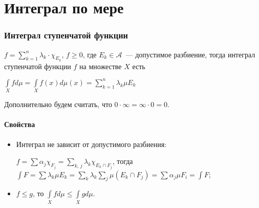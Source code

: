 \documentclass{article}
\begin{document}
\newcommand{\R}[0]{\mathbb{R}}
\newcommand{\RM}[0]{\mathbb{R}^m}
\newcommand{\dist}[0]{\mathrm{dist}}
\newcommand{\rang}[0]{\mathrm{rang} $\ $}
\newcommand{\grad}[0]{\mathrm{grad} $\ $}
\newcommand{\Lin}[0]{\mathrm{Lin} $\ $}

\tableofcontents

\newpage 

\part{Интеграл по мере}

    \section{Интеграл ступенчатой функции}
    
        $f = \sum\limits_{k = 1}^n \lambda_k \cdot \chi_{E_k}$, $f \geqslant 0$, где $E_k \in \mathcal{A}$~--- допустимое разбиение, тогда интеграл ступенчатой функции $f$ на множестве $X$ есть
                
        $\int\limits_{X} f d \mu = \int\limits_{X} f(x) d \mu(x) = \sum\limits_{k = 1}^n \lambda_k \mu E_k$ 
        
        Дополнительно будем считать, что $0 \cdot \infty = \infty \cdot 0 = 0$.
                
        \subsection{Свойства}
                
            \begin{itemize}
                
                \item Интеграл не зависит от допустимого разбиения:
                    
                    $f = \sum \alpha_j \chi_{F_j} = \sum\limits_{k,\, j} \lambda_k \chi_{E_k \cap F_j}$, тогда $\int F = \sum \lambda_k \mu E_k = \sum\limits_{k} \lambda_k \sum\limits_j \mu (E_k \cap F_j) = \sum \alpha_j \mu F_i = \int F$;
                        
                \item $f \leqslant g$, то $\int\limits_{X} f d \mu \leqslant \int\limits_{X} g d \mu$.
                
            \end{itemize}
            
    \newpage
                
\end{document}
